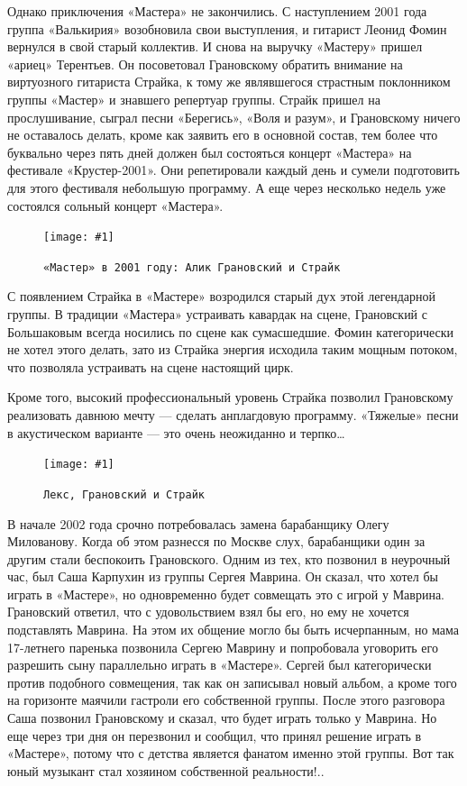 \documentclass[16pt,a5paper]{book}
\newcommand{\myincludegraphics}[1]{\texttt{[image: \#1]}}
\begin{document}
Однако приключения «Мастера» не закончились. С наступлением 2001 года группа «Валькирия» возобновила свои выступления, и
гитарист Леонид Фомин вернулся в свой старый коллектив. И снова на выручку «Мастеру» пришел «ариец» Терентьев. Он
посоветовал Грановскому обратить внимание на виртуозного гитариста Страйка, к тому же являвшегося страстным поклонником
группы «Мастер» и знавшего репертуар группы. Страйк пришел на прослушивание, сыграл песни «Берегись», «Воля и разум», и
Грановскому ничего не оставалось делать, кроме как заявить его в основной состав, тем более что буквально через пять
дней должен был состояться концерт «Мастера» на фестивале «Крустер-2001». Они репетировали каждый день и сумели
подготовить для этого фестиваля небольшую программу. А еще через несколько недель уже состоялся сольный концерт
«Мастера».

\begin{figure}[h]
    \centering
    \myincludegraphics{Image34}
    \caption{\texttt{«Мастер» в 2001 году: Алик Грановский и Страйк}}
\end{figure}

С появлением Страйка в «Мастере» возродился старый дух этой легендарной группы. В традиции «Мастера» устраивать кавардак
на сцене, Грановский с Большаковым всегда носились по сцене как сумасшедшие. Фомин категорически не хотел этого делать,
зато из Страйка энергия исходила таким мощным потоком, что позволяла устраивать на сцене настоящий цирк.

Кроме того, высокий профессиональный уровень Страйка позволил Грановскому реализовать давнюю мечту — сделать анплагдовую
программу. «Тяжелые» песни в акустическом варианте — это очень неожиданно и терпко\ldots

\begin{figure}[h]
    \centering
    \myincludegraphics{Image35}
    \caption{\texttt{Лекс, Грановский и Страйк}}
\end{figure}

В начале 2002 года срочно потребовалась замена барабанщику Олегу Милованову. Когда об этом разнесся по Москве слух,
барабанщики один за другим стали беспокоить Грановского. Одним из тех, кто позвонил в неурочный час, был Саша Карпухин
из группы Сергея Маврина. Он сказал, что хотел бы играть в «Мастере», но одновременно будет совмещать это с игрой у
Маврина. Грановский ответил, что с удовольствием взял бы его, но ему не хочется подставлять Маврина. На этом их общение
могло бы быть исчерпанным, но мама 17-летнего паренька позвонила Сергею Маврину и попробовала уговорить его разрешить
сыну параллельно играть в «Мастере». Сергей был категорически против подобного совмещения, так как он записывал новый
альбом, а кроме того на горизонте маячили гастроли его собственной группы. После этого разговора Саша позвонил
Грановскому и сказал, что будет играть только у Маврина. Но еще через три дня он перезвонил и сообщил, что принял
решение играть в «Мастере», потому что с детства является фанатом именно этой группы. Вот так юный музыкант стал
хозяином собственной реальности!..
\end{document}
